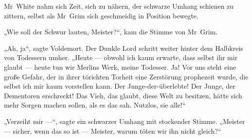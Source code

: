 Mr~White nahm sich Zeit, sich zu nähern, der schwarze Umhang schienen zu zittern, selbst als Mr~Grim sich geschmeidig in Position bewegte.

„Wie soll der Schwur lauten, Meister?“, kam die Stimme von Mr~Grim.

„Ah, ja“, sagte Voldemort. Der Dunkle Lord schritt weiter hinter dem Halbkreis von Todessern umher.
„Heute — obwohl ich kaum erwarte, dass selbst ihr mir glaubt — heute tun wir Merlins Werk, meine Todesser. Ja! Vor uns steht eine große Gefahr, der in ihrer törichten Torheit eine Zerstörung prophezeit wurde, die selbst ich mir kaum vorstellen kann. Der Junge-der-überlebte! Der Junge, der Dementoren erschreckt! Das Vieh, das glaubt, diese Welt zu besitzen, hätte sich mehr Sorgen machen sollen, als es das sah. Nutzlos, sie alle!“

„Verzeiht mir —“, sagte ein schwarzer Umhang mit stockender Stimme.
„Meister — sicher, wenn das so ist — Meister, warum töten wir ihn nicht gleich?“

